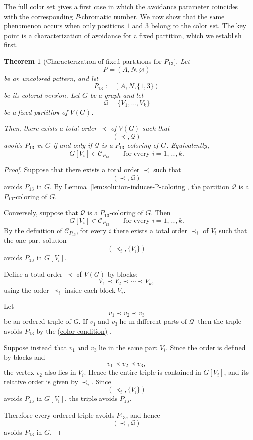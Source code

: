 \documentclass[12pt]{article}
\theoremstyle{plain}
\newtheorem{theorem}{Theorem}[section]
\theoremstyle{definition}
\theoremstyle{remark}
\theoremstyle{definition}
\newcommand{\colorcondition}{%
  \hyperref[def:avoid:cond:color]{(color condition)}\xspace
}
\begin{document}
The full color set gives a first case in which the avoidance parameter
coincides with the corresponding \(P\)-chromatic number. We now show that
the same phenomenon occurs when only positions \(1\) and \(3\) belong to
the color set. The key point is a characterization of avoidance for a fixed
partition, which we establish first.

\begin{theorem}[Characterization of fixed partitions for \(P_{13}\)]
\label{thm:13-fixed-partition-characterization}
Let
\[
P=(A,N,\varnothing)
\]
be an uncolored pattern, and let
\[
P_{13}:=(A,N,\{1,3\})
\]
be its colored version. Let \(G\) be a graph and let
\[
\mathcal Q=\{V_1,\dots,V_k\}
\]
be a fixed partition of \(V(G)\).

Then, there exists a total order \(\prec\) of \(V(G)\) such that
\[
(\prec,\mathcal Q)
\]
avoids \(P_{13}\) in \(G\) if and only if \(\mathcal Q\) is a
\(P_{13}\)-coloring of \(G\). Equivalently,
\[
G[V_i]\in\mathcal C_{P_{13}}
\qquad
\text{for every }i=1,\dots,k.
\]
\end{theorem}


\begin{proof}
Suppose that there exists a total order \(\prec\) such that
\[
(\prec,\mathcal Q)
\]
avoids \(P_{13}\) in \(G\). By
Lemma~\ref{lem:solution-induces-P-coloring}, the partition
\(\mathcal Q\) is a \(P_{13}\)-coloring of \(G\).

Conversely, suppose that \(\mathcal Q\) is a \(P_{13}\)-coloring of \(G\).
Then
\[
G[V_i]\in\mathcal C_{P_{13}}
\qquad
\text{for every }i=1,\dots,k.
\]
By the definition of \(\mathcal C_{P_{13}}\), for every \(i\) there exists
a total order \(\prec_i\) of \(V_i\) such that the one-part solution
\[
(\prec_i,\{V_i\})
\]
avoids \(P_{13}\) in \(G[V_i]\).

Define a total order \(\prec\) of \(V(G)\) by blocks:
\[
V_1\prec V_2\prec\cdots\prec V_k,
\]
using the order \(\prec_i\) inside each block \(V_i\).

Let
\[
v_1\prec v_2\prec v_3
\]
be an ordered triple of \(G\). If \(v_1\) and \(v_3\) lie in different
parts of \(\mathcal Q\), then the triple avoids \(P_{13}\) by the
\colorcondition{}.

Suppose instead that \(v_1\) and \(v_3\) lie in the same part \(V_i\).
Since the order is defined by blocks and
\[
v_1\prec v_2\prec v_3,
\]
the vertex \(v_2\) also lies in \(V_i\). Hence the entire triple is
contained in \(G[V_i]\), and its relative order is given by \(\prec_i\).
Since
\[
(\prec_i,\{V_i\})
\]
avoids \(P_{13}\) in \(G[V_i]\), the triple avoids \(P_{13}\).

Therefore every ordered triple avoids \(P_{13}\), and hence
\[
(\prec,\mathcal Q)
\]
avoids \(P_{13}\) in \(G\).
\end{proof}
\end{document}
